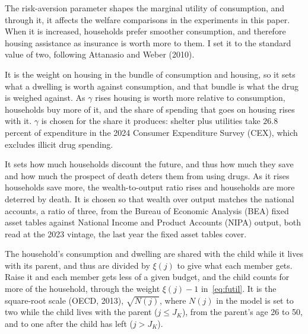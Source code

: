 \documentclass[10pt]{article}
\begin{document}
\begin{description}\setlength{\itemsep}{0.25em}\setlength{\parskip}{0em}
\item[$\sigma$, risk aversion.]  The risk-aversion parameter shapes the marginal utility of consumption, and through it, it affects the welfare comparisons in the experiments in this paper. When it is increased, households prefer smoother consumption, and therefore housing assistance as insurance is worth more to them. I set it to the standard value of two, following
Attanasio and Weber (2010).
\item[$\gamma$, the weight on housing services.] It is the weight on housing in the
bundle of consumption and housing, so it sets what a dwelling is worth against
consumption, and that bundle is what the drug is weighed against. As
$\gamma$ rises housing is worth more relative to consumption, households buy more of it,
and the share of spending that goes on housing rises with it. $\gamma$ is chosen for the share
it produces: shelter plus utilities take $26.8$ percent of expenditure in the 2024 Consumer Expenditure Survey (CEX), which excludes illicit drug spending.
\item[$\beta$, the discount factor.] It sets how much households discount the
future, and thus how much they save and how much the prospect of death deters them from using drugs. As it rises households save more, the
 wealth-to-output ratio rises and households are more deterred by death. It is chosen so that wealth over output
matches the national accounts, a ratio of three, from the Bureau of Economic Analysis (BEA) fixed asset tables
against National Income and Product Accounts (NIPA) output, both read at the 2023 vintage, the last year the fixed asset tables cover.
\item[$\xi(j)$, the equivalence scale.] The household's consumption and
dwelling are shared with the child while it lives with its parent, and thus are divided by
$\xi(j)$ to give what each member gets. Raise it and each member gets less of a given budget, and the child counts for more of the household, through the weight $\xi(j)-1$ in~\eqref{eq:futil}. It is the square-root scale (OECD, 2013), $\sqrt{N(j)}$, where $N(j)$ in the model is set to two while
the child lives with the parent ($j\le J_K$), from the parent's age 26 to 50, and to one after the child has left ($j>J_K$).
\end{description}
\end{document}
